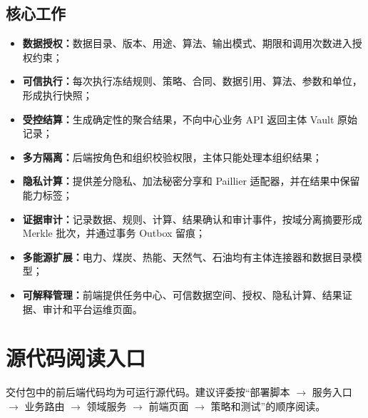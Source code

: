 \documentclass[UTF8,a4paper,zihao=-4,oneside]{ctexart}
\newcommand{\term}[1]{\textbf{\color{HiddenGreenDark}#1}}
\begin{document}
\subsection{核心工作}

\begin{itemize}
  \item \term{数据授权：}数据目录、版本、用途、算法、输出模式、期限和调用次数进入授权约束；
  \item \term{可信执行：}每次执行冻结规则、策略、合同、数据引用、算法、参数和单位，形成执行快照；
  \item \term{受控结算：}生成确定性的聚合结果，不向中心业务 API 返回主体 Vault 原始记录；
  \item \term{多方隔离：}后端按角色和组织校验权限，主体只能处理本组织结果；
  \item \term{隐私计算：}提供差分隐私、加法秘密分享和 Paillier 适配器，并在结果中保留能力标签；
  \item \term{证据审计：}记录数据、规则、计算、结果确认和审计事件，按域分离摘要形成 Merkle 批次，并通过事务 Outbox 留痕；
  \item \term{多能源扩展：}电力、煤炭、热能、天然气、石油均有主体连接器和数据目录模型；
  \item \term{可解释管理：}前端提供任务中心、可信数据空间、授权、隐私计算、结果证据、审计和平台运维页面。
\end{itemize}

\section{源代码阅读入口}

交付包中的前后端代码均为可运行源代码。建议评委按“部署脚本 $\rightarrow$ 服务入口 $\rightarrow$ 业务路由 $\rightarrow$ 领域服务 $\rightarrow$ 前端页面 $\rightarrow$ 策略和测试”的顺序阅读。
\end{document}
